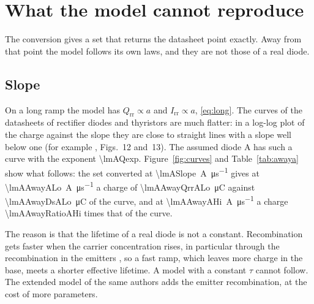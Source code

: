 \documentclass[10pt,a4paper]{scrartcl}
\newcommand{\Irr}{I_\mathrm{rr}}
\newcommand{\Qrr}{Q_\mathrm{rr}}
\begin{document}
\section{What the model cannot reproduce}
\label{sec:limits}
The conversion gives a set that returns the datasheet point exactly. Away from that point the model follows its own laws, and they are not those of a real diode.

\subsection{Slope}
\label{sec:slope}
On a long ramp the model has $\Qrr \propto a$ and $\Irr \propto a$, \eqref{eq:long}. The curves of the datasheets of rectifier diodes and thyristors are much flatter: in a log-log plot of the charge against the slope they are close to straight lines with a slope well below one (for example \cite{an5950}, Figs.~12 and~13). The assumed diode A has such a curve with the exponent \num{\lmAQexp}. Figure~\ref{fig:curves} and Table~\ref{tab:awaya} show what follows: the set converted at \SI{\lmASlope}{\ampere\per\micro\second} gives at \SI{\lmAAwayALo}{\ampere\per\micro\second} a charge of \SI{\lmAAwayQrrALo}{\micro\coulomb} against \SI{\lmAAwayDsALo}{\micro\coulomb} of the curve, and at \SI{\lmAAwayAHi}{\ampere\per\micro\second} a charge \num{\lmAAwayRatioAHi} times that of the curve.

The reason is that the lifetime of a real diode is not a constant. Recombination gets faster when the carrier concentration rises, in particular through the recombination in the emitters \cite{schlangenotto1969}, so a fast ramp, which leaves more charge in the base, meets a shorter effective lifetime. A model with a constant $\tau$ cannot follow. The extended model of the same authors \cite{ma1993} adds the emitter recombination, at the cost of more parameters.
\end{document}
